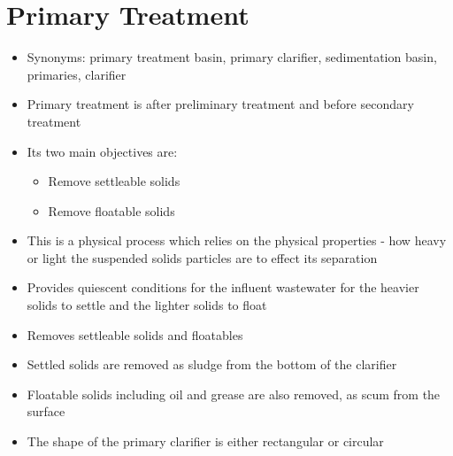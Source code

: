 \section{Primary Treatment}	

\begin{itemize}
\item Synonyms:  primary treatment basin, primary clarifier, sedimentation basin, primaries, clarifier

	
		\item Primary treatment is after preliminary treatment and 				before secondary treatment
		\item Its two main objectives are: 
			\begin{itemize}
				\item Remove settleable solids
				\item Remove floatable solids
			\end{itemize}
		\item This is a physical process which relies on the physical 			properties - how heavy or light the suspended solids particles 		are to effect its separation
		\item Provides quiescent conditions for the influent 					wastewater for the heavier solids to settle and the lighter 			solids to float
		\item Removes settleable solids and floatables
		\item Settled solids are removed as sludge from the bottom of 			the clarifier
		\item Floatable solids including oil and grease are also 				removed, as scum from the surface\\
		\item The shape of the primary clarifier is either rectangular 		or circular
	

\end{itemize}
